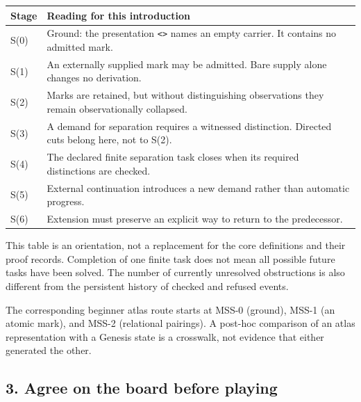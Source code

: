 \documentclass[
  11pt,
]{article}
\newcommand{\passthrough}[1]{#1}
\begin{document}
\begin{longtable}[]{@{}
  >{\raggedright\arraybackslash}p{}
  >{\raggedright\arraybackslash}p{}@{}}
\toprule\noalign{}
\begin{minipage}[b]{\linewidth}\raggedright
Stage
\end{minipage} & \begin{minipage}[b]{\linewidth}\raggedright
Reading for this introduction
\end{minipage} \\
\midrule\noalign{}
\endhead
\bottomrule\noalign{}
\endlastfoot
S(0) & Ground: the presentation \passthrough{\lstinline!<>!} names an
empty carrier. It contains no admitted mark. \\
S(1) & An externally supplied mark may be admitted. Bare supply alone
changes no derivation. \\
S(2) & Marks are retained, but without distinguishing observations they
remain observationally collapsed. \\
S(3) & A demand for separation requires a witnessed distinction.
Directed cuts belong here, not to S(2). \\
S(4) & The declared finite separation task closes when its required
distinctions are checked. \\
S(5) & External continuation introduces a new demand rather than
automatic progress. \\
S(6) & Extension must preserve an explicit way to return to the
predecessor. \\
\end{longtable}

This table is an orientation, not a replacement for the core definitions
and their proof records. Completion of one finite task does not mean all
possible future tasks have been solved. The number of currently
unresolved obstructions is also different from the persistent history of
checked and refused events.

The corresponding beginner atlas route starts at MSS-0 (ground), MSS-1
(an atomic mark), and MSS-2 (relational pairings). A post-hoc comparison
of an atlas representation with a Genesis state is a crosswalk, not
evidence that either generated the other.

\subsection{3. Agree on the board before
playing}\label{agree-on-the-board-before-playing}
\end{document}
